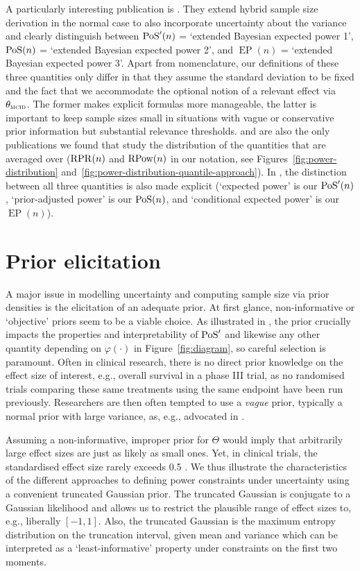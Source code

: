 \documentclass{article}
\newcommand{\EP}{\operatorname{EP}}
\begin{document}
A particularly interesting publication is
\citet{liu-2010}.
They extend hybrid sample size derivation in the normal case to also incorporate uncertainty about the
variance and clearly distinguish between
$\operatorname{PoS}'(n)$ = `extended Bayesian expected power 1',
$\operatorname{PoS}(n)$ = `extended Bayesian expected power 2',
and $\EP(n)$ = `extended Bayesian expected power 3'.
Apart from nomenclature, our definitions of these three quantities
only differ in that they assume the standard deviation to be
fixed and the fact that we accommodate the optional notion of a relevant effect via $\mcid$.
The former makes explicit formulas more manageable,
the latter is important to keep sample sizes small in situations with vague or conservative prior information but substantial relevance thresholds.
\citet{liu-2010} and \citet{rufibach_15} are also the only
publications we found that study the distribution of the quantities that are averaged over ($\operatorname{RPR}(n)$ and $\operatorname{RPow}({ n })$ in our notation, see Figures~\ref{fig:power-distribution} and~\ref{fig:power-distribution-quantile-approach}).
In \citet{ciarleglio-2015}, the distinction between all three
quantities is also made explicit (`expected power' is our $\operatorname{PoS}'(n)$, `prior-adjusted power' is our $\operatorname{PoS}(n)$, and `conditional expected power' is our $\EP(n)$).



\section{Prior elicitation}

A major issue in modelling uncertainty and computing sample size via prior densities is the elicitation of an adequate prior.
At first glance, non-informative or `objective' priors seem to be a viable choice.
As illustrated in \citet{rufibach_15}, the prior crucially impacts the properties and interpretability of $\operatorname{PoS}'$ and likewise any other quantity depending on $\varphi(\cdot)$ in Figure~\ref{fig:diagram}, so careful selection is paramount.
Often in clinical research, there is no direct prior knowledge on the effect size of interest, e.g., overall survival in a phase III trial, as no randomised trials comparing these same treatments using the same endpoint have been run previously.
Researchers are then often tempted to use a {\it vague} prior, typically a normal prior with large variance, as, e.g., advocated in \cite{saint-hilary-2019}.

Assuming a non-informative, improper prior for $\Theta$ would imply that arbitrarily large effect sizes are just as likely as small ones.
Yet, in clinical trials, the standardised effect size rarely exceeds 0.5 \citep{lamberink2018}.
We thus illustrate the characteristics of the different approaches to defining power constraints under uncertainty using a convenient truncated Gaussian prior.
The truncated Gaussian is conjugate to a Gaussian likelihood and allows us to restrict the plausible range of effect sizes to, e.g., liberally $[-1, 1]$.
Also, the truncated Gaussian is the maximum entropy distribution on the truncation interval, given mean and variance which can be interpreted as a `least-informative' property under constraints on the first two moments.
\end{document}
